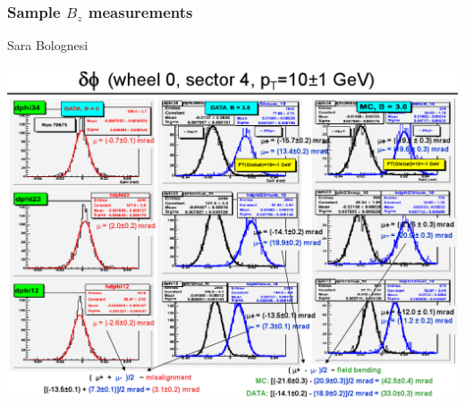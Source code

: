 \documentclass[compress]{beamer}
\begin{document}
\begin{frame}
\frametitle{Sample $B_z$ measurements}
{\tiny Sara Bolognesi}

\includegraphics[width=\linewidth]{ugo_analysis.png}
\end{frame}
\end{document}
